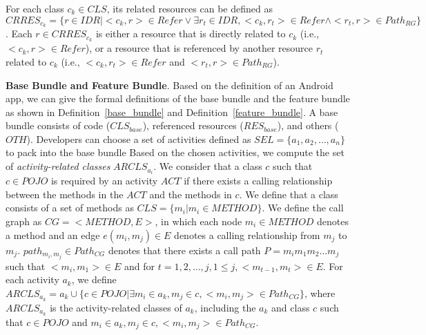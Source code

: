 For each class $c_k \in CLS$, its related resources can be defined as $CRRES_{c_k}=\{r\in IDR|<c_k, r>\in Refer \lor \exists r_t\in IDR, <c_k, r_t>\in Refer \land <r_t, r>\in Path_{RG}\}$. 
Each $r\in CRRES_{c_k}$ is either a resource that is directly related to $c_k$ (i.e., $<c_k,r>\in Refer$), or a resource that is referenced by another resource $r_t$ related to $c_k$ (i.e., $<c_k, r_t>\in Refer$ and $<r_t, r>\in Path_{RG}$).

\noindent\textbf{Base Bundle and Feature Bundle}.
Based on the definition of an Android app, we can give the formal definitions of the base bundle and the feature bundle as shown in Definition~\ref{base_bundle} and Definition~\ref{feature_bundle}. 
A base bundle consists of code ($CLS_{base}$), referenced resources ($RES_{base}$), and others ($OTH$). 
Developers can choose a set of activities defined as $SEL=\{a_1, a_2, \dots, a_n\}$ to pack into the base bundle
Based on the chosen activities, we compute the set of \emph{activity-related classes} $ARCLS_{a_i}$.
We consider that a class $c$ such that $c\in POJO$ is required by an activity $ACT$ if there exists a calling relationship between the methods in the $ACT$ and the methods in $c$.
We define that a class consists of a set of methods as $CLS=\{m_i|m_i\in METHOD\}$. 
We define the call graph as $CG=<METHOD, E>$, in which each node $m_i\in METHOD$ denotes a method and an edge $e(m_i,m_j)\in E$ denotes a calling relationship from $m_j$ to $m_j$. $path_{m_i,m_j} \in Path_{CG}$ denotes that there exists a call path $P=m_im_1m_2\dots m_j$ such that $<m_i,m_1>\in E$ and for $t=1,2,\dots,j, 1\le j, <m_{t-1}, m_t>\in E$. For each activity ${a_k}$, we define $ARCLS_{a_k}=a_k\cup\{c\in POJO|\exists m_i\in a_k, m_j\in c, <m_i, m_j>\in Path_{CG}\}$, where $ARCLS_{a_k}$ is the activity-related classes of  ${a_k}$, including the ${a_k}$ and class $c$ such that $c\in POJO$ and $m_i\in a_k, m_j\in c, <m_i, m_j>\in Path_{CG}$. 

